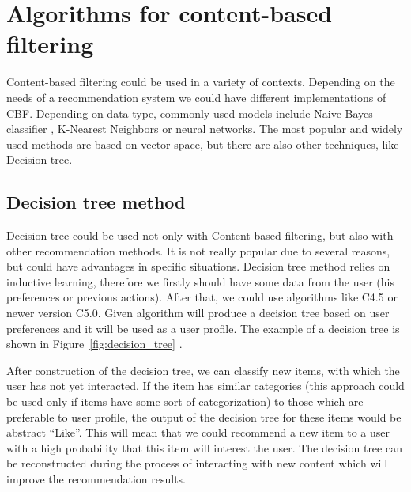 \section{Algorithms for content-based filtering}\label{sec:cbf_algorithms}
Content-based filtering could be used in a variety of contexts. Depending on the needs of a recommendation system we could have different implementations of CBF. Depending on data type, commonly used models include Naive Bayes classifier \cite{Naive_classifier}, K-Nearest Neighbors or neural networks.  The most popular and widely used methods are based on vector space, but there are also other techniques, like Decision tree.

\subsection{Decision tree method}
Decision tree could be used not only with Content-based filtering, but also with other recommendation methods. It is not really popular due to several reasons, but could have advantages in specific situations. Decision tree method relies on inductive learning, therefore we firstly should have some data from the user (his preferences or previous actions). After that, we could use algorithms like C4.5\cite{C4_5} or newer version C5.0. Given algorithm will produce a decision tree based on user preferences and it will be used as a user profile. The example of a decision tree is shown in Figure~\ref{fig:decision_tree} \cite{Decision_Tree}.

After construction of the decision tree, we can classify new items, with which the user has not yet interacted. If the item has similar categories (this approach could be used only if items have some sort of categorization) to those which are preferable to user profile, the output of the decision tree for these items would be abstract “Like”. This will mean that we could recommend a new item to a user with a high probability that this item will interest the user. The decision tree can be reconstructed during the process of interacting with new content which will improve the recommendation results.

